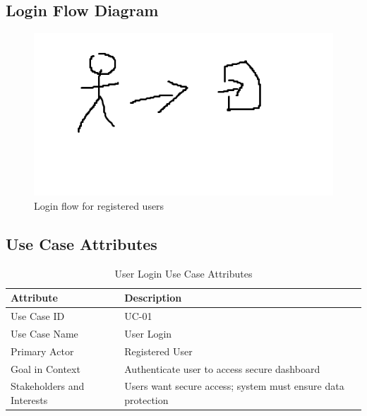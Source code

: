 \documentclass[12pt]{article}
\begin{document}
\subsection*{Login Flow Diagram}
\clearpage
\begin{landscape}
\begin{figure}[ht]
  \centering
  \includegraphics[width=\linewidth]{login_flow.png}
  \caption{Login flow for registered users}
  \label{fig:loginflow}
\end{figure}
\end{landscape}
\clearpage

\subsection*{Use Case Attributes}

\begin{longtable}{|p{4cm}|p{10cm}|}
\caption{User Login Use Case Attributes} \label{tab:login-attributes} \\
\hline
\textbf{Attribute} & \textbf{Description} \\
\hline
Use Case ID & UC-01 \\
\hline
Use Case Name & User Login \\
\hline
Primary Actor & Registered User \\
\hline
Goal in Context & Authenticate user to access secure dashboard \\
\hline
Stakeholders and Interests & Users want secure access; system must ensure data protection \\
\hline
\end{longtable}
\end{document}
